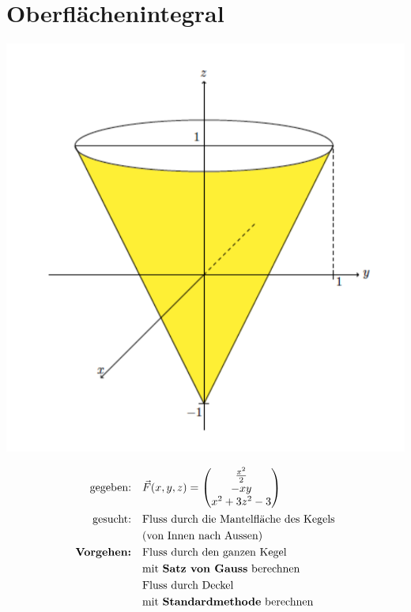 \documentclass[11pt]{article}
\begin{document}
\section{Oberfl{\"a}chenintegral}

\begin{minipage}[c]{0.5\textwidth}
\centering
\includegraphics[width=\linewidth,keepaspectratio=true]{images/fluss}
\end{minipage}
%
\begin{minipage}[c]{0.5\textwidth}
\begin{equation*}
\begin{split}
	\text{gegeben:}\quad & \vec{F}(x,y,z) = \begin{pmatrix}
		\frac{x^2}{2} \\ -xy \\ x^2 + 3z^2 - 3
	\end{pmatrix} \\
	\text{gesucht:}\quad & \text{Fluss durch die Mantelfl{\"a}che des Kegels} \\
	& \text{(von Innen nach Aussen)} \\
	\textbf{Vorgehen:}\quad & \text{Fluss durch den ganzen Kegel} \\
	& \text{mit \textbf{Satz von Gauss} berechnen} \\
	& \text{Fluss durch Deckel} \\
	& \text{mit \textbf{Standardmethode} berechnen}
\end{split}
\end{equation*}
\end{minipage}
\end{document}
